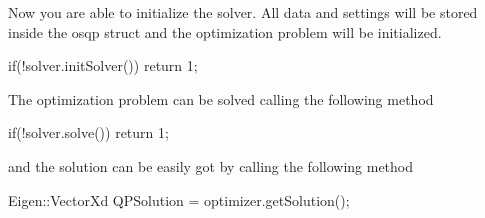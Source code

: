 Now you are able to initialize the solver. All data and settings will be stored inside the osqp struct and the optimization problem will be initialized. 
\begin{DoxyCode}
\textcolor{keywordflow}{if}(!solver.initSolver()) \textcolor{keywordflow}{return} 1;
\end{DoxyCode}


The optimization problem can be solved calling the following method 
\begin{DoxyCode}
\textcolor{keywordflow}{if}(!solver.solve()) \textcolor{keywordflow}{return} 1;
\end{DoxyCode}
 and the solution can be easily got by calling the following method 
\begin{DoxyCode}
Eigen::VectorXd QPSolution = optimizer.getSolution();
\end{DoxyCode}


